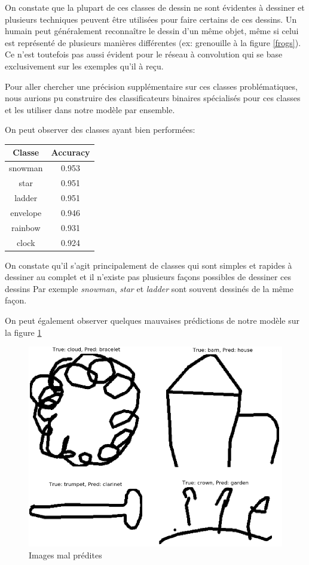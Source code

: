 On constate que la plupart de ces classes de dessin ne sont évidentes à dessiner et plusieurs techniques peuvent être utilisées pour faire certains de ces dessins. 
Un humain peut généralement reconnaître le dessin d'un même objet, même si celui est représenté de plusieurs manières différentes (ex: grenouille à la figure \ref{frogs}). 
Ce n'est toutefois pas aussi évident pour le réseau à convolution qui se base exclusivement sur les exemples qu'il à reçu.

Pour aller chercher une précision supplémentaire sur ces classes problématiques, nous aurions pu construire des classificateurs binaires spécialisés pour ces classes et les utiliser dans notre modèle par ensemble.

On peut observer des classes ayant bien performées: 

\begin{center}
\begin{tabular}{|c|c|}
\hline
\textbf{Classe} & \textbf{Accuracy} \\ \hline
snowman & 0.953 \\ \hline
star & 0.951 \\ \hline
ladder & 0.951 \\ \hline
envelope & 0.946 \\ \hline
rainbow & 0.931 \\ \hline
clock & 0.924 \\ \hline
\end{tabular}
\end{center}


On constate qu'il s'agit principalement de classes qui sont simples et rapides à dessiner au complet et il n'existe pas plusieurs façons possibles de dessiner ces dessins
Par exemple \emph{snowman}, \emph{star} et \emph{ladder} sont souvent dessinés de la même façon.


On peut également observer quelques mauvaises prédictions de notre modèle sur la figure \ref{comborate}

\begin{figure}[h]
	\includegraphics[width=\linewidth]{images/combo_rate.png} %
	\caption{Images mal prédites} %
	\label{comborate} 
\end{figure}

